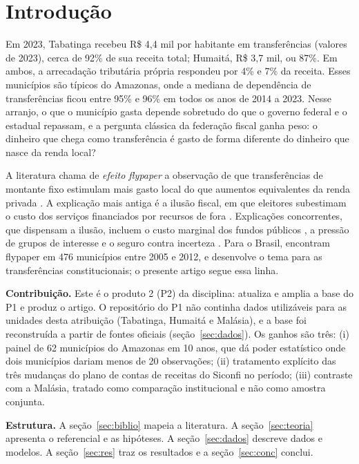 \documentclass[10pt,twocolumn]{article}
\begin{document}
\section{Introdução}
Em 2023, Tabatinga recebeu R\$ 4,4 mil por habitante em transferências (valores de 2023), cerca de 92\% de sua receita total; Humaitá, R\$ 3,7 mil, ou 87\%. Em ambos, a arrecadação tributária própria respondeu por 4\% e 7\% da receita. Esses municípios são típicos do Amazonas, onde a mediana de dependência de transferências ficou entre 95\% e 96\% em todos os anos de 2014 a 2023. Nesse arranjo, o que o município gasta depende sobretudo do que o governo federal e o estadual repassam, e a pergunta clássica da federação fiscal ganha peso: o dinheiro que chega como transferência é gasto de forma diferente do dinheiro que nasce da renda local?

A literatura chama de \textit{efeito flypaper} a observação de que transferências de montante fixo estimulam mais gasto local do que aumentos equivalentes da renda privada \citep{hamilton1983,bailey1998}. A explicação mais antiga é a ilusão fiscal, em que eleitores subestimam o custo dos serviços financiados por recursos de fora \citep{dollery1996,turnbull1998}. Explicações concorrentes, que dispensam a ilusão, incluem o custo marginal dos fundos públicos \citep{hamilton1986,dahlby2011}, a pressão de grupos de interesse \citep{dougan1988} e o seguro contra incerteza \citep{vegh2015}. Para o Brasil, \citet{ferreira2019} encontram flypaper em 476 municípios entre 2005 e 2012, e \citet{ferreiralog2021} desenvolve o tema para as transferências constitucionais; o presente artigo segue essa linha.

\textbf{Contribuição.} Este é o produto 2 (P2) da disciplina: atualiza e amplia a base do P1 e produz o artigo. O repositório do P1 não continha dados utilizáveis para as unidades desta atribuição (Tabatinga, Humaitá e Malásia), e a base foi reconstruída a partir de fontes oficiais (seção~\ref{sec:dados}). Os ganhos são três: (i) painel de 62 municípios do Amazonas em 10 anos, que dá poder estatístico onde dois municípios dariam menos de 20 observações; (ii) tratamento explícito das três mudanças do plano de contas de receitas do Siconfi no período; (iii) contraste com a Malásia, tratado como comparação institucional e não como amostra conjunta.

\textbf{Estrutura.} A seção~\ref{sec:biblio} mapeia a literatura. A seção~\ref{sec:teoria} apresenta o referencial e as hipóteses. A seção~\ref{sec:dados} descreve dados e modelos. A seção~\ref{sec:res} traz os resultados e a seção~\ref{sec:conc} conclui.
\end{document}
